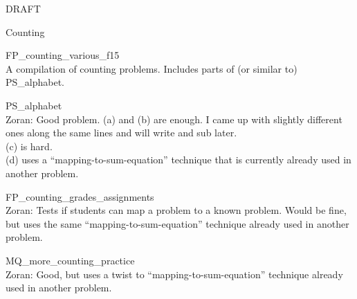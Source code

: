 \documentclass[quiz]{mcs}
\begin{document}


\begin{staffnotes}
\begin{center}
{\Large DRAFT}
\end{center}
\end{staffnotes}

\begin{staffnotes}
\begin{center}
{\large Counting}
\end{center}
\end{staffnotes}

\examspace
\begin{staffnotes}
FP\_counting\_various\_f15\\
A compilation of counting problems. Includes parts of (or similar to)
PS\_alphabet. 
\end{staffnotes}

\begin{staffnotes}
PS\_alphabet\\
Zoran: Good problem. (a) and (b) are enough.
I came up with slightly different ones along the same lines and will
write and sub later.\\
 (c) is hard.\\
 (d) uses a ``mapping-to-sum-equation'' technique that
is currently already used in another problem.
\end{staffnotes}

\begin{staffnotes}
FP\_counting\_grades\_assignments\\
Zoran: Tests if students can map a problem to a known problem.
Would be fine, but uses the same ``mapping-to-sum-equation'' technique
already used in another problem.
\end{staffnotes}

\begin{staffnotes}
MQ\_more\_counting\_practice\\
Zoran: Good, but uses a twist to ``mapping-to-sum-equation'' technique
already used in another problem.
\end{staffnotes}
\end{document}
